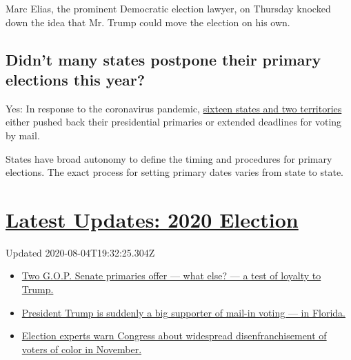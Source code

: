 Marc Elias, the prominent Democratic election lawyer, on Thursday
knocked down the idea that Mr. Trump could move the election on his own.

\hypertarget{didnt-many-states-postpone-their-primary-elections-this-year}{%
\subsection{Didn't many states postpone their primary elections this
year?}\label{didnt-many-states-postpone-their-primary-elections-this-year}}

Yes: In response to the coronavirus pandemic,
\href{https://www.nytimes.com/article/2020-campaign-primary-calendar-coronavirus.html}{sixteen
states and two territories} either pushed back their presidential
primaries or extended deadlines for voting by mail.

States have broad autonomy to define the timing and procedures for
primary elections. The exact process for setting primary dates varies
from state to state.

\hypertarget{latest-updates-2020-election}{%
\section{\texorpdfstring{\href{https://www.nytimes.com/2020/08/04/us/elections/primary-election-michigan-arizona-kansas.html?action=click\&pgtype=Article\&state=default\&region=MAIN_CONTENT_1\&context=storylines_live_updates}{Latest
Updates: 2020
Election}}{Latest Updates: 2020 Election}}\label{latest-updates-2020-election}}

Updated 2020-08-04T19:32:25.304Z

\begin{itemize}
\tightlist
\item
  \href{https://www.nytimes.com/2020/08/04/us/elections/primary-election-michigan-arizona-kansas.html?action=click\&pgtype=Article\&state=default\&region=MAIN_CONTENT_1\&context=storylines_live_updates\#link-3924dd44}{Two
  G.O.P. Senate primaries offer --- what else? --- a test of loyalty to
  Trump.}
\item
  \href{https://www.nytimes.com/2020/08/04/us/elections/primary-election-michigan-arizona-kansas.html?action=click\&pgtype=Article\&state=default\&region=MAIN_CONTENT_1\&context=storylines_live_updates\#link-32b39e33}{President
  Trump is suddenly a big supporter of mail-in voting --- in Florida.}
\item
  \href{https://www.nytimes.com/2020/08/04/us/elections/primary-election-michigan-arizona-kansas.html?action=click\&pgtype=Article\&state=default\&region=MAIN_CONTENT_1\&context=storylines_live_updates\#link-6d019753}{Election
  experts warn Congress about widespread disenfranchisement of voters of
  color in November.}
\end{itemize}


